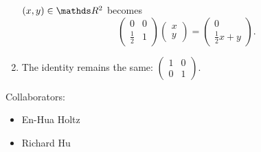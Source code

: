 \documentclass{review-sheet}
\begin{document}
\begin{solution}
\begin{enumerate}[label=(\alph*)]
          $(x,y)\in \R^2$ becomes \[
            \begin{pmatrix} 0&0\\\frac{1}{2}&1\end{pmatrix}  \begin{pmatrix} x \\y
          \end{pmatrix} = \begin{pmatrix} 0\\\frac{1}{2}x+y \end{pmatrix} 
          .\]
        \item The identity remains the same: $\begin{pmatrix} 1&0\\0&1 \end{pmatrix} $.
  \end{enumerate}
\end{solution}
 
\clearpage
Collaborators:
\begin{itemize}
  \item En-Hua Holtz
  \item Richard Hu
\end{itemize}
\end{document}
